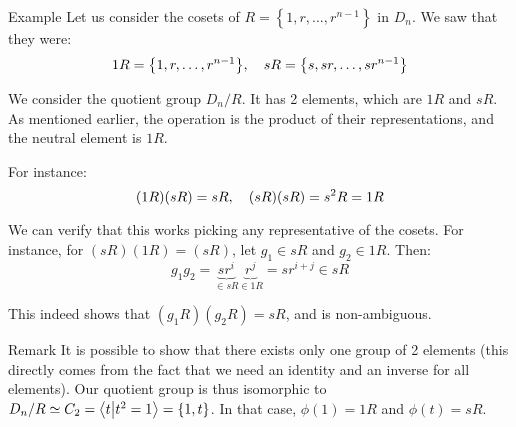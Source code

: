 \documentclass[a4paper]{article}
\begin{document}
\begin{parag}{Example}
    Let us consider the cosets of $R = \left\{1, r, \ldots, r^{n-1}\right\}$ in $D_n$. We saw that they were: 
    \[1R = \left\{1, r, \ldots, r^{n-1}\right\}, \mathspace sR = \left\{s, sr, \ldots, sr^{n-1}\right\}\]
    
    We consider the quotient group $D_n / R$. It has 2 elements, which are $1R$ and $sR$. As mentioned earlier, the operation is the product of their representations, and the neutral element is $1 R$.

    For instance: 
    \[\left(1R\right)\left(sR\right) = sR, \mathspace \left(sR\right)\left(sR\right) = s^2 R = 1R\]

    We can verify that this works picking any representative of the cosets. For instance, for $\left(sR\right)\left(1R\right) = \left(sR\right)$, let $g_1 \in sR$ and $g_2 \in 1R$. Then: 
    \[g_1 g_2 = \underbrace{s r^i}_{\in sR} \underbrace{r^j}_{\in 1R} = s r^{i + j} \in sR\]

    This indeed shows that $\left(g_1 R\right)\left(g_2 R\right) = sR$, and is non-ambiguous.

    \begin{subparag}{Remark}
        It is possible to show that there exists only one group of 2 elements (this directly comes from the fact that we need an identity and an inverse for all elements). Our quotient group is thus isomorphic to $D_n / R \simeq C_2 = \braket{t}{t^2 = 1} = \left\{1, t\right\}$. In that case, $\phi\left(1\right) = 1R$ and $\phi\left(t\right) = sR$.
    \end{subparag}
\end{parag}
\end{document}
